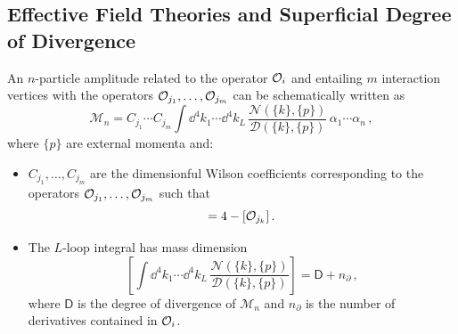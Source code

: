 \begin{subappendices}
\section{Effective Field Theories and Superficial Degree of Divergence\label{app:SDOD_EFT}}

An $n$-particle amplitude related to the operator $\mathcal{O}_i$ 
and entailing $m$ interaction vertices with the operators $\mathcal{O}_{j_1},\dotsc,\mathcal{O}_{j_m}$ can be schematically written as
\begin{equation}
    \mathcal M_{n} = C_{j_1}\dotsm C_{j_m} 
     \int \dd^4 k_1 \dotsm \dd^4 k_L \,\frac{\mathcal N
     (\{k\},\{p\})}{\mathcal D(\{k\},\{p\})} \,
    \alpha_1 \dotsm \alpha_{n} \,,
\end{equation}
where $\{p\}$ are external momenta and:
\begin{itemize}
    \item $C_{j_1},\dotsc, C_{j_m}$ are the dimensionful Wilson coefficients corresponding to the operators $\mathcal{O}_{j_1},\dotsc,\mathcal{O}_{j_m}$ 
    such that
    \begin{equation}
        [C_{j_k}]= 4 - [\Ocal_{j_k}]\,.
    \end{equation}        

    \item The $L$-loop integral has mass dimension 
    \begin{equation}
    \left[\int \dd^4 k_1\dotsi \dd^4 k_L\, \frac{\mathcal N(\{k\},\{p\})}{\mathcal D(\{k\},\{p\})}\right]=
    \mathsf D + n_\partial\,,
    \end{equation}        
    where $\mathsf D$ is the degree of divergence of 
    $\mathcal M_{n}$ and $n_\partial$ is the number 
    of derivatives contained in $\mathcal{O}_i$.


\end{itemize}
\end{subappendices}
